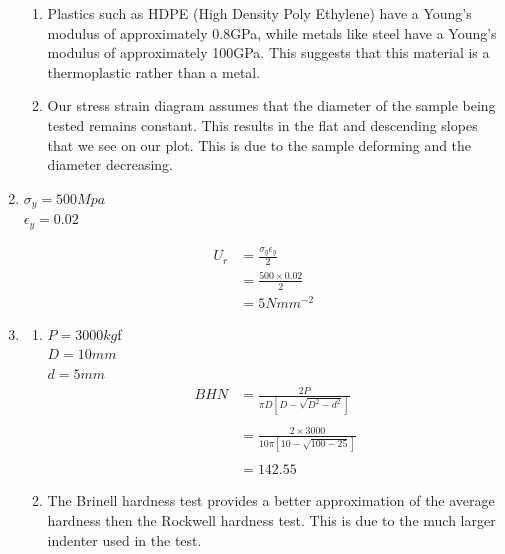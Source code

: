 \documentclass[a4paper,11pt]{article}
\begin{document}
\begin{enumerate}
\begin{enumerate}
        \item 
        Plastics such as HDPE (High Density Poly Ethylene) have a Young's modulus of approximately 0.8GPa, while metals like steel have a Young's modulus of approximately 100GPa. This suggests that this material is a thermoplastic rather than a metal. 

        \item 
        Our stress strain diagram assumes that the diameter of the sample being tested remains constant. This results in the flat and descending slopes that we see on our plot. This is due to the sample deforming and the diameter decreasing.\\

    \end{enumerate}

    \item 
    $\sigma_y = 500Mpa$\\
    $\epsilon_y = 0.02$

    \begin{align*}
        U_r&=\frac{\sigma_y \epsilon_y}{2}\\
        &= \frac{500 \times 0.02}{2}\\
        &= 5Nmm^{-2}
    \end{align*} 
    
    \item 

    \begin{enumerate}
        \item 
        $P = 3000kg$f\\
        $D = 10mm$\\
        $d = 5mm$\\

        \begin{align*}
            BHN &= \frac{2P}{\pi D \left[ D - \sqrt{D^2 - d^2} \right]}\\\\
            &= \frac{2 \times 3000}{10\pi \left[ 10 - \sqrt{100 - 25} \right]}\\\\
            &=142.55
        \end{align*}
        
        \item The Brinell hardness test provides a better approximation of the average hardness then the Rockwell hardness test. This is due to the much larger indenter used in the test.

    \end{enumerate}


\end{enumerate}
\end{document}
